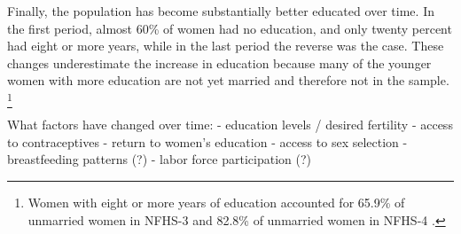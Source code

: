 Finally, the population has become substantially better educated over time.
In the first period, almost 60\% of women had no education, and only twenty percent had
eight or more years, while in the last period the reverse was the case.
These changes underestimate the increase in education because many of the younger women 
with more education are not yet married and therefore not in the sample.%
\footnote{
Women with eight or more years of education accounted for 65.9\% of
unmarried women in NFHS-3 and 82.8\% of unmarried women in NFHS-4
\citep{International-Institute-for-Population-Sciences-IIPS2007,International-Institute-for-Population-Sciences-IIPS2017}.
}



What factors have changed over time:
    - education levels / desired fertility
    - access to contraceptives
    - return to women's education
    - access to sex selection
    - breastfeeding patterns (?)
    - labor force participation (?)


